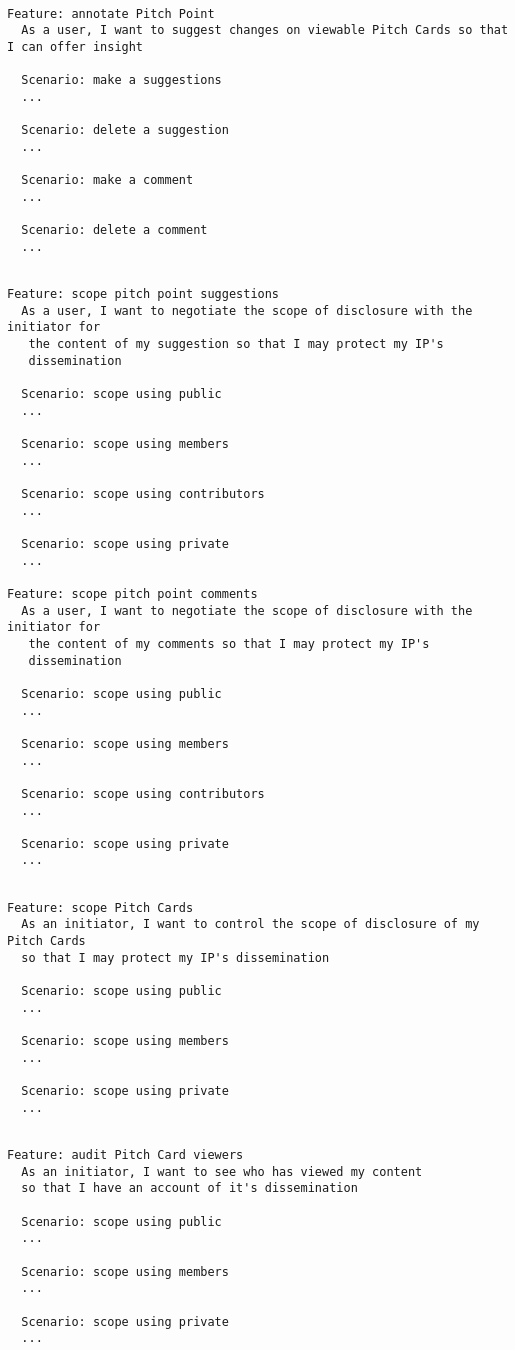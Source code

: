 \begin{verbatim}

Feature: annotate Pitch Point
  As a user, I want to suggest changes on viewable Pitch Cards so that I can offer insight

  Scenario: make a suggestions
  ...

  Scenario: delete a suggestion
  ...

  Scenario: make a comment
  ...

  Scenario: delete a comment
  ...

\end{verbatim}

\begin{verbatim}

Feature: scope pitch point suggestions
  As a user, I want to negotiate the scope of disclosure with the initiator for
   the content of my suggestion so that I may protect my IP's 
   dissemination

  Scenario: scope using public
  ...

  Scenario: scope using members
  ...

  Scenario: scope using contributors
  ...

  Scenario: scope using private
  ...

Feature: scope pitch point comments
  As a user, I want to negotiate the scope of disclosure with the initiator for
   the content of my comments so that I may protect my IP's 
   dissemination

  Scenario: scope using public
  ...

  Scenario: scope using members
  ...

  Scenario: scope using contributors
  ...

  Scenario: scope using private
  ...

\end{verbatim}

\begin{verbatim}

Feature: scope Pitch Cards
  As an initiator, I want to control the scope of disclosure of my Pitch Cards 
  so that I may protect my IP's dissemination

  Scenario: scope using public
  ...

  Scenario: scope using members
  ...

  Scenario: scope using private
  ...

\end{verbatim}

\begin{verbatim}

Feature: audit Pitch Card viewers
  As an initiator, I want to see who has viewed my content 
  so that I have an account of it's dissemination

  Scenario: scope using public
  ...

  Scenario: scope using members
  ...

  Scenario: scope using private
  ...

\end{verbatim}

